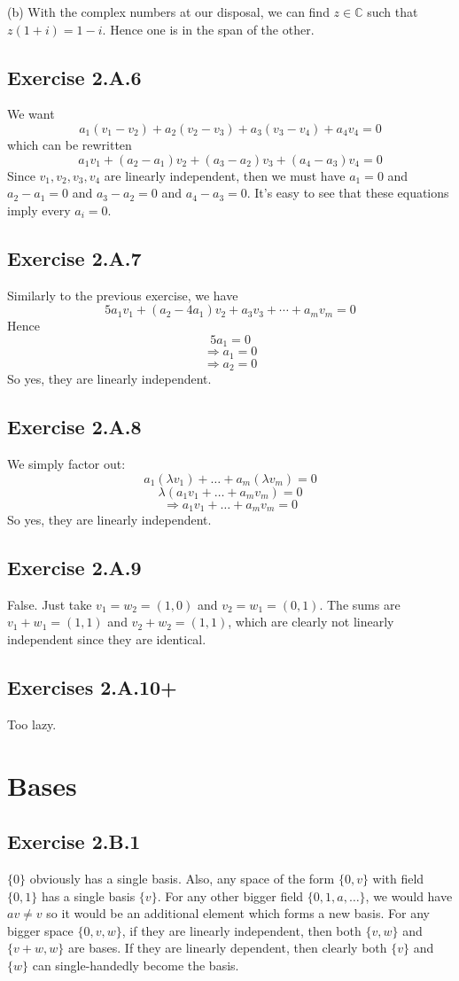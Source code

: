 \documentclass{book}
\begin{document}
\noindent
(b)
With the complex numbers at our disposal, we can find $z \in \mathbb{C}$ such that $z (1 + i) = 1 - i$. Hence one is in the span of the other.

\subsection*{Exercise 2.A.6}
We want
$$a_1 (v_1 - v_2) + a_2 (v_2 - v_3) + a_3 (v_3 - v_4) + a_4 v_4 = 0$$
which can be rewritten
$$a_1 v_1 + (a_2 - a_1) v_2 + (a_3 - a_2) v_3 + (a_4 - a_3) v_4 = 0$$
Since $v_1, v_2, v_3, v_4$ are linearly independent, then we must have $a_1 = 0$ and $a_2 - a_1 = 0$ and $a_3 - a_2 = 0$ and $a_4 - a_3 = 0$. It's easy to see that these equations imply every $a_i = 0$.

\subsection*{Exercise 2.A.7}
Similarly to the previous exercise, we have
$$5 a_1 v_1 + (a_2 - 4a_1) v_2 + a_3 v_3 + \cdots + a_m v_m = 0$$
Hence
$$5a_1 = 0$$
$$\Rightarrow a_1 = 0$$
$$\Rightarrow a_2 = 0$$
So yes, they are linearly independent.

\subsection*{Exercise 2.A.8}
We simply factor out:
$$a_1 (\lambda v_1) + \ldots + a_m (\lambda v_m) = 0$$
$$\lambda (a_1 v_1 + \ldots + a_m v_m) = 0$$
$$\Rightarrow a_1 v_1 + \ldots + a_m v_m = 0$$
So yes, they are linearly independent.

\subsection*{Exercise 2.A.9}
False. Just take $v_1 = w_2 = (1, 0)$ and $v_2 = w_1 = (0, 1)$. The sums are $v_1 + w_1 = (1, 1)$ and $v_2 + w_2 = (1, 1)$, which are clearly not linearly independent since they are identical.

\subsection*{Exercises 2.A.10+}
Too lazy.

\section{Bases}

\subsection*{Exercise 2.B.1}
$\{ 0 \}$ obviously has a single basis. Also, any space of the form $\{ 0, v \}$ with field $\{ 0, 1 \}$ has a single basis $\{ v \}$. For any other bigger field $\{ 0, 1, a, \ldots \}$, we would have $av \neq v$ so it would be an additional element which forms a new basis. For any bigger space $\{ 0, v, w \}$, if they are linearly independent, then both $\{ v, w \}$ and $\{ v + w, w \}$ are bases. If they are linearly dependent, then clearly both $\{ v \}$ and $\{ w \}$ can single-handedly become the basis.
\end{document}
